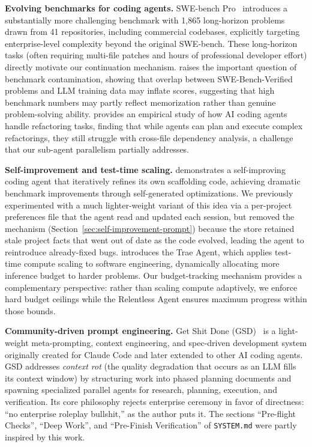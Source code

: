 \documentclass{article}
\begin{document}
\textbf{Evolving benchmarks for coding agents.} SWE-bench Pro~\citep{deng2025swebenchpro} introduces a substantially more challenging benchmark with 1,865 long-horizon problems drawn from 41 repositories, including commercial codebases, explicitly targeting enterprise-level complexity beyond the original SWE-bench.  These long-horizon tasks (often requiring multi-file patches and hours of professional developer effort) directly motivate our continuation mechanism.  \citet{prathifkumar2025swebenchverified} raises the important question of benchmark contamination, showing that overlap between SWE-Bench-Verified problems and LLM training data may inflate scores, suggesting that high benchmark numbers may partly reflect memorization rather than genuine problem-solving ability. \citet{horikawa2025agentic} provides an empirical study of how AI coding agents handle refactoring tasks, finding that while agents can plan and execute complex refactorings, they still struggle with cross-file dependency analysis, a challenge that our sub-agent parallelism partially addresses.

\textbf{Self-improvement and test-time scaling.} \citet{robeyns2025selfimproving} demonstrates a self-improving coding agent that iteratively refines its own scaffolding code, achieving dramatic benchmark improvements through self-generated optimizations.  We previously experimented with a much lighter-weight variant of this idea via a per-project preferences file that the agent read and updated each session, but removed the mechanism (Section~\ref{sec:self-improvement-prompt}) because the store retained stale project facts that went out of date as the code evolved, leading the agent to reintroduce already-fixed bugs.  \citet{gao2025trae} introduces the Trae Agent, which applies test-time compute scaling to software engineering, dynamically allocating more inference budget to harder problems.  Our budget-tracking mechanism provides a complementary perspective: rather than scaling compute adaptively, we enforce hard budget ceilings while the Relentless Agent ensures maximum progress within those bounds.

\textbf{Community-driven prompt engineering.} Get Shit Done (GSD)~\citep{gsd2025} is a light-weight meta-prompting, context engineering, and spec-driven development system originally created for Claude Code and later extended to other AI coding agents.  GSD addresses \emph{context rot} (the quality degradation that occurs as an LLM fills its context window) by structuring work into phased planning documents and spawning specialized parallel agents for research, planning, execution, and verification.  Its core philosophy rejects enterprise ceremony in favor of directness: ``no enterprise roleplay bullshit,'' as the author puts it.  The sections ``Pre-flight Checks'', ``Deep Work'', and ``Pre-Finish Verification'' of \texttt{SYSTEM.md} were partly inspired by this work.
\end{document}
